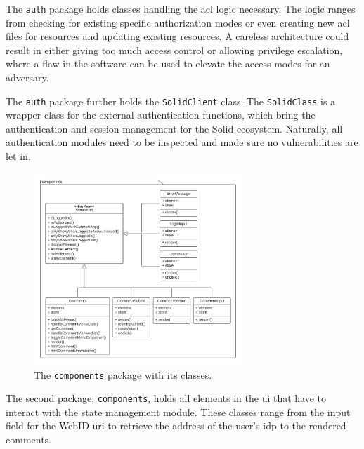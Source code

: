 The \texttt{auth} package holds classes handling the \gls{acl} logic necessary. The logic ranges from checking for existing specific authorization modes or even creating new \gls{acl} files for resources and updating existing resources. A careless architecture could result in either giving too much access control or allowing privilege escalation, where a flaw in the software can be used to elevate the access modes for an adversary.

The \texttt{auth} package further holds the \texttt{SolidClient} class. The \texttt{SolidClass} is a wrapper class for the external authentication functions, which bring the authentication and session management for the Solid ecosystem. Naturally, all authentication modules need to be inspected and made sure no vulnerabilities are let in.

\begin{figure}[H]
    \centering
    \includegraphics[width=0.7\textwidth]{prototype/graphs/poc-comment-package-components.png}
    \caption{The \texttt{components} package with its classes.}
    \label{fig:poc-comment-package-components}
\end{figure}

The second package, \texttt{components}, holds all elements in the \gls{ui} that have to interact with the state management module. These classes range from the input field for the WebID \gls{uri} to retrieve the address of the user's \gls{idp} to the rendered comments.
\vspace{0.5cm}
